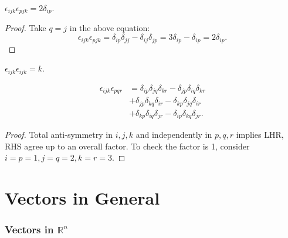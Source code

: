 \documentclass[10pt]{article}
\begin{document}
    \begin{proposition}\label{prop:eeidentity2}
        $ \epsilon_{ijk}\epsilon_{pjk}=2\delta_{ip}. $
    \end{proposition}
    \begin{proof}
        Take $q=j$ in the above equation:
        \[
            \epsilon_{ijk}\epsilon_{pjk}=\delta_{ip}\delta_{jj}-\delta_{ij}\delta_{jp}=3\delta_{ip}-\delta_{ip}=2\delta_{ip}
        .\]
    \end{proof}
    \begin{proposition}\label{prop:eeidentity3}
        $  \epsilon_{ijk}\epsilon_{ijk}=k $.
    \end{proposition}
    \begin{proposition}\label{prop:eeidentity4}
        \[
            \begin{aligned}
                \epsilon_{ijk}\epsilon_{pqr}&=\delta_{ip}\delta_{jq}\delta_{kr}-\delta_{jp}\delta_{iq}\delta_{kr}\\
                &+\delta_{jp}\delta_{kq}\delta_{ir}-\delta_{kp}\delta_{jq}\delta_{ir}\\
                &+\delta_{kp}\delta_{iq}\delta_{jr}-\delta_{ip}\delta_{kq}\delta_{jr}.
            \end{aligned}
        \]
    \end{proposition}
    \begin{proof}
        Total anti-symmetry in $i,j,k$ and independently in $p,q,r$ implies LHR, RHS agree up to an overall factor. To check the factor is 1, consider $i=p=1, j=q=2, k=r=3$.
    \end{proof}
    \part{Vectors in General}
    \section{Vectors in $ \mathbb{R}^n $}
\end{document}
